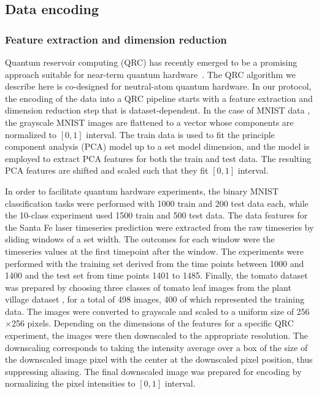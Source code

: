 \documentclass[english,floatfix,twocolumn,showpacs, aps, prx, reprint, superscriptaddress, longbibliography]{revtex4-2}
\begin{document}
\subsection{Data encoding}

\subsubsection{Feature extraction and dimension reduction}

Quantum reservoir computing (QRC) has recently emerged to be a promising approach suitable for near-term quantum hardware~\cite{Fujii2017, Ghosh2019, Ghosh2021, Martinez2021, Saeed2021, Suzuki2022, Burgess2022, Bravo2022, Dudas2023, Yasuda2023, Gotting2023, Xia2023, Mujal2023, Hu2023, Senanian2023, ahmed2024, Sannia2024}. The QRC algorithm we describe here is co-designed for neutral-atom quantum hardware. In our protocol, the encoding of the data into a QRC pipeline starts with a feature extraction and dimension reduction step that is dataset-dependent. In the case of MNIST data \cite{Deng2012}, the grayscale MNIST images are flattened to a vector whose components are normalized to $[0, 1]$ interval. The train data is used to fit the principle component analysis (PCA)  model \cite{Pearson1901, MultivariateStatsjl} up to a set model dimension, and the model is employed to extract PCA features for both the train and test data. The resulting PCA features are shifted and scaled such that they fit $[0, 1]$ interval.


In order to facilitate quantum hardware experiments, the binary MNIST classification tasks were performed with 1000 train and 200 test data each, while the 10-class experiment used 1500 train and 500 test data. The data features for the Santa Fe laser timeseries \cite{Weigend1993-bg} prediction were extracted from the raw timeseries by sliding windows of a set width. The outcomes for each window were the timeseries values at the first timepoint after the window. The experiments were performed with the training set derived from the time points between 1000 and 1400 and the test set from time points 1401 to 1485. Finally, the tomato dataset was prepared by choosing three classes of tomato leaf images from the plant village dataset \cite{hughes2016tomato}, for a total of 498 images, 400 of which represented the training data. The images were converted to grayscale and scaled to a uniform size of 256$\times$256 pixels. Depending on the dimensions of the features for a specific QRC experiment, the images were then downscaled to the appropriate resolution. The downscaling corresponds to taking the intensity average over a box of the size of the downscaled image pixel with the center at the downscaled pixel position, thus suppressing aliasing. The final downscaled image was prepared for encoding by normalizing the pixel intensities to $[0, 1]$ interval.
\end{document}
